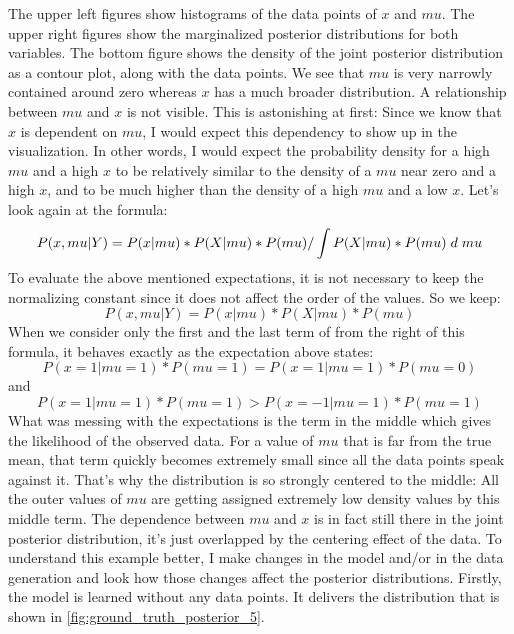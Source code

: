 \documentclass{article}
\begin{document}
The upper left figures show histograms of the data points of $x$ and $mu$. The upper right figures show the marginalized posterior distributions for both variables. The bottom figure shows the density of the joint posterior distribution as a contour plot, along with the data points. We see that $mu$ is very narrowly contained around zero whereas $x$ has a much broader distribution. A relationship between $mu$ and $x$ is not visible. This is astonishing at first: Since we know that $x$ is dependent on $mu$, I would expect this dependency to show up in the visualization. In other words, I would expect the probability density for a high $mu$ and a high $x$ to be relatively similar to the density of a $mu$ near zero and a high $x$, and to be much higher than the density of a high $mu$ and a low $x$.
Let's look again at the formula:
\begin{equation}
P(x,mu|Y) = P(x|mu) * P(X|mu) * P(mu) / \int P(X|mu) * P(mu) \hspace{1mm} d \hspace{1mm} mu
\end{equation}
To evaluate the above mentioned expectations, it is not necessary to keep the normalizing constant since it does not affect the order of the values. So we keep:
\begin{equation}
P(x,mu|Y) = P(x|mu) * P(X|mu) * P(mu)
\end{equation}
When we consider only the first and the last term of from the right of this formula, it behaves exactly as the expectation above states: \begin{equation}
P(x=1|mu=1)*P(mu=1) = P(x=1|mu=1)*P(mu=0)
\end{equation}
and 
\begin{equation}
P(x=1|mu=1)*P(mu=1) > P(x=-1|mu=1)*P(mu=1)
\end{equation} What was messing with the expectations is the term in the middle which gives the likelihood of the observed data. For a value of $mu$ that is far from the true mean, that term quickly becomes extremely small since all the data points speak against it. That's why the distribution is so strongly centered to the middle: All the outer values of $mu$ are getting assigned extremely low density values by this middle term. 
The dependence between $mu$ and $x$ is in fact still there in the joint posterior distribution, it's just overlapped by the centering effect of the data. To understand this example better, I make changes in the model and/or in the data generation and look how those changes affect the posterior distributions. Firstly, the model is learned without any data points. It delivers the distribution that is shown in \autoref{fig:ground_truth_posterior_5}.
\end{document}
